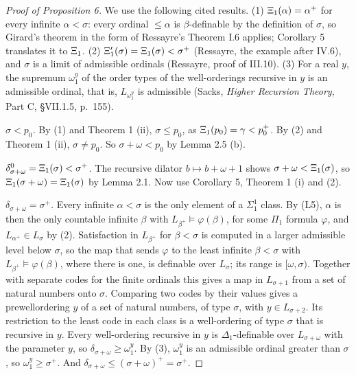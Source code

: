 \documentclass[11pt]{article}
\begin{document}
\begin{proof}[Proof of Proposition 6] We use the following cited results. (1) $\Xi_1(\alpha) = \alpha^+$ for every
infinite $\alpha < \sigma$: every ordinal $\le \alpha$ is $\beta$-definable by the definition of $\sigma$, so
Girard's theorem in the form of Ressayre's Theorem I.6 applies; Corollary 5 translates it to $\Xi_1$. (2)
$\Xi'_1(\sigma) = \Xi_1(\sigma) < \sigma^+$ (Ressayre, the example after IV.6), and $\sigma$ is a limit of admissible
ordinals (Ressayre, proof of III.10). (3) For a real $y$, the supremum $\omega_1^y$ of the order types of the
well-orderings recursive in $y$ is an admissible ordinal, that is, $L_{\omega_1^y}$ is admissible (Sacks,
\emph{Higher Recursion Theory}, Part C, \S VII.1.5, p.~155).

\emph{$\sigma < p_0$.} By (1) and Theorem 1 (ii), $\sigma \le p_0$, as $\Xi_1(p_0) = \gamma < p_0^+$. By (2)
and Theorem 1 (ii), $\sigma \ne p_0$. So $\sigma + \omega < p_0$ by Lemma 2.5 (b).

\emph{$\delta^0_{\sigma + \omega} = \Xi_1(\sigma) < \sigma^+$.} The recursive dilator $b \mapsto b + \omega + 1$ shows
$\sigma + \omega < \Xi_1(\sigma)$, so $\Xi_1(\sigma + \omega) = \Xi_1(\sigma)$ by Lemma 2.1. Now use Corollary 5, Theorem 1 (i) and (2).

\emph{$\delta_{\sigma + \omega} = \sigma^+$.} Every infinite $\alpha < \sigma$ is the only element of a $\Sigma^1_1$
class. By (L5), $\alpha$ is then the only countable infinite $\beta$ with $L_{\beta^+} \models \varphi(\beta)$, for
some $\Pi_1$ formula $\varphi$, and $L_{\alpha^+} \in L_{\sigma}$ by (2). Satisfaction in $L_{\beta^+}$ for
$\beta < \sigma$ is computed in a larger admissible level below $\sigma$, so the map that sends $\varphi$ to the
least infinite $\beta < \sigma$ with $L_{\beta^+} \models \varphi(\beta)$, where there is one, is definable over
$L_{\sigma}$; its range is $[\omega, \sigma)$. Together with separate codes for the finite ordinals this gives a map
in $L_{\sigma + 1}$ from a set of natural numbers onto $\sigma$. Comparing two codes by their values gives a
prewellordering $y$ of a set of natural numbers, of type $\sigma$, with $y \in L_{\sigma + 2}$. Its restriction to
the least code in each class is a well-ordering of type $\sigma$ that is recursive in $y$. Every well-ordering recursive in
$y$ is $\Delta_1$-definable over $L_{\sigma + \omega}$ with the parameter $y$, so
$\delta_{\sigma + \omega} \ge \omega_1^y$. By (3), $\omega_1^y$ is an admissible ordinal greater than $\sigma$, so
$\omega_1^y \ge \sigma^+$. And $\delta_{\sigma + \omega} \le (\sigma + \omega)^+ = \sigma^+$.


\end{proof}
\end{document}
